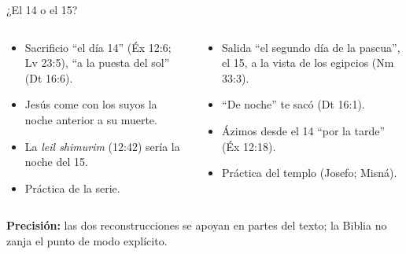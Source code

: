 \documentclass[hyperref={bookmarks=false},aspectratio=169]{beamer}
\newcommand{\precision}[1]{{\footnotesize\color{sepia}\textbf{Precisión:} #1}}
\begin{document}
\begin{frame}{¿El 14 o el 15?}
\begin{columns}[t,onlytextwidth]
\begin{column}{0.49\textwidth}
\begin{tcolorbox}[colback=papiro,colframe=mostaza!85!tierraroja,boxrule=0.8pt,arc=2pt,title={Al comenzar el 14},fonttitle=\bfseries\scriptsize,coltitle=caferojizo,colbacktitle=mostaza!35,fontupper=\scriptsize]
\begin{itemize}\scriptsize
\item Sacrificio ``el día 14'' (Éx 12:6; Lv 23:5), ``a la puesta del sol'' (Dt 16:6).
\item Jesús come con los suyos la noche anterior a su muerte.
\item La \emph{leil shimurim} (12:42) sería la noche del 15.
\item Práctica de la serie.
\end{itemize}
\end{tcolorbox}
\end{column}
\begin{column}{0.49\textwidth}
\begin{tcolorbox}[colback=papiro,colframe=mostaza!85!tierraroja,boxrule=0.8pt,arc=2pt,title={Al terminar el 14 (cena en el 15)},fonttitle=\bfseries\scriptsize,coltitle=caferojizo,colbacktitle=mostaza!35,fontupper=\scriptsize]
\begin{itemize}\scriptsize
\item Salida ``el segundo día de la pascua'', el 15, a la vista de los egipcios (Nm 33:3).
\item ``De noche'' te sacó (Dt 16:1).
\item Ázimos desde el 14 ``por la tarde'' (Éx 12:18).
\item Práctica del templo (Josefo; Misná).
\end{itemize}
\end{tcolorbox}
\end{column}
\end{columns}
\precision{las dos reconstrucciones se apoyan en partes del texto; la Biblia no zanja el punto de modo explícito.}
\end{frame}
\end{document}
